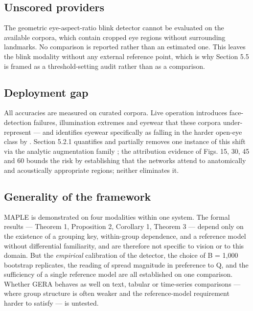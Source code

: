 \FloatBarrier

\subsection{Unscored providers}

The geometric eye-aspect-ratio blink detector cannot be evaluated on the available corpora, which contain cropped eye regions without surrounding landmarks. No comparison is reported rather than an estimated one. This leaves the blink modality without any external reference point, which is why Section 5.5 is framed as a threshold-setting audit rather than as a comparison.

\FloatBarrier

\subsection{Deployment gap}

All accuracies are measured on curated corpora. Live operation introduces face-detection failures, illumination extremes and eyewear that these corpora under-represent --- and  identifies eyewear specifically as falling in the harder open-eye class by . Section 5.2.1 quantifies and partially removes one instance of this shift via the analytic augmentation family ; the attribution evidence of Figs. 15, 30, 45 and 60 bounds the risk by establishing that the networks attend to anatomically and acoustically appropriate regions; neither eliminates it.

\FloatBarrier

\subsection{Generality of the framework}

MAPLE is demonstrated on four modalities within one system. The formal results --- Theorem 1, Proposition 2, Corollary 1, Theorem 3 --- depend only on the existence of a grouping key, within-group dependence, and a reference model without differential familiarity, and are therefore not specific to vision or to this domain. But the \emph{empirical} calibration of the detector, the choice of B = 1,000 bootstrap replicates, the reading of spread magnitude in preference to Q, and the sufficiency of a single reference model are all established on one comparison. Whether GERA behaves as well on text, tabular or time-series comparisons --- where group structure is often weaker and the reference-model requirement harder to satisfy --- is untested.
